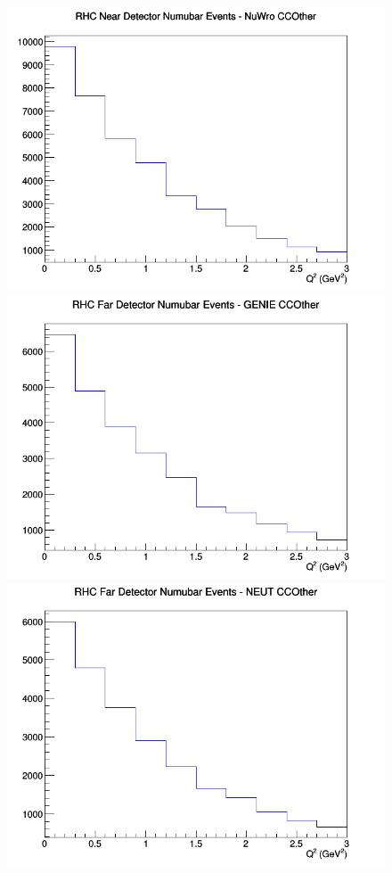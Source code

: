 \documentclass[12pt]{article}
\begin{document}
\begin{figure}[h]
\includegraphics[width=\linewidth]{eff_Q2/GAr/CCOther_RHC_ND_numubar_Q2_NuWro.png}
\endminipage
\newline
{}
\includegraphics[width=\linewidth]{eff_Q2/GAr/CCOther_RHC_FD_numubar_Q2_GENIE.png}
\endminipage
{}
\includegraphics[width=\linewidth]{eff_Q2/GAr/CCOther_RHC_FD_numubar_Q2_NEUT.png}

\end{figure}
\end{document}
